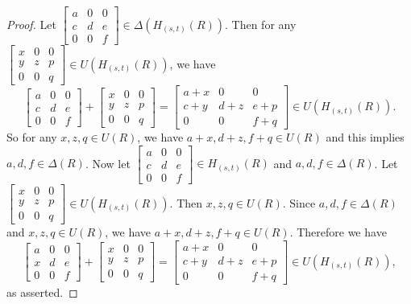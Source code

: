 \documentclass[12pt, reqno]{amsart}
\numberwithin{equation}{section}
\begin{document}
\begin{proof}
    Let $\begin{bmatrix}a&0&0\\c&d&e\\0&0&f
\end{bmatrix}\in \Delta (H_{(s,t)}(R))$. Then for any $\begin{bmatrix}x&0&0\\y&z&p\\0&0&q
\end{bmatrix} \in U(H_{(s,t)}(R))$, we have $$\begin{bmatrix}a&0&0\\c&d&e\\0&0&f
\end{bmatrix}+\begin{bmatrix}x&0&0\\y&z&p\\0&0&q
\end{bmatrix}=\begin{bmatrix}a+x&0&0\\c+y&d+z&e+p\\0&0&f+q
\end{bmatrix}\in U(H_{(s,t)}(R)).$$ So for any $x,z,q\in U(R)$, we have $a+x,d+z, f+q\in U(R)$ and this implies $a,d,f\in \Delta(R)$. Now let $\begin{bmatrix}a&0&0\\c&d&e\\0&0&f
\end{bmatrix}\in H_{(s,t)}(R)$ and $a,d,f\in \Delta(R)$. Let $\begin{bmatrix}x&0&0\\y&z&p\\0&0&q
\end{bmatrix} \in U(H_{(s,t)}(R))$. Then $x,z,q\in U(R)$. Since $a,d,f\in \Delta(R)$ and $x,z,q\in U(R)$, we have $a+x,d+z,f+q\in U(R)$. Therefore we have $$\begin{bmatrix}a&0&0\\x&d&e\\0&0&f
\end{bmatrix}+\begin{bmatrix}x&0&0\\y&z&p\\0&0&q
\end{bmatrix}=\begin{bmatrix}a+x&0&0\\c+y&d+z&e+p\\0&0&f+q
\end{bmatrix} \in U(H_{(s,t)}(R)),$$ as asserted.
\end{proof}
\end{document}
